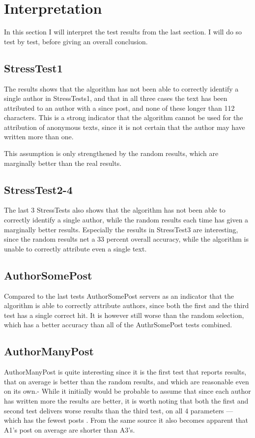 \section{Interpretation}
\label{interpretation}
In this section I will interpret the test results from the last section. I will do so test by test, before giving an overall conclusion.

\subsection{StressTest1}
The results shows that the algorithm has not been able to correctly identify a single author in StressTests1, and that in all three cases the text has been attributed to an author with a since post, and none of these longer than 112 characters. This is a strong indicator that the algorithm cannot be used for the attribution of anonymous texts, since it is not certain that the author may have written more than one.  

This assumption is only strengthened by the random results, which are marginally better than the real results.

\subsection{StressTest2-4}
The last 3 StressTests also shows that the algorithm has not been able to correctly identify a single author, while the random results each time has given a marginally better results. Especially the results in StressTest3 are interesting, since the random results net a 33 percent overall accuracy, while the algorithm is unable to correctly attribute even a single text.

\subsection{AuthorSomePost}
Compared to the last tests AuthorSomePost servers as an indicator that the algorithm is able to correctly attribute authors, since both the first and the third test has a single correct hit. It is however still worse than the random selection, which has a better accuracy than all of the AuthrSomePost tests combined.

\subsection{AuthorManyPost}
AuthorManyPost is quite interesting since it is the first test that reports results, that on average is better than the random results, and which are reasonable even on its own.-
While it initially would be probable to assume that since each author has written more the results are better, it is worth noting that both the first and second test delivers  worse results than the third test, on all 4 parameters --- which has the fewest posts . From the same source it also becomes apparent that A1's post on average are shorter than A3's. 

